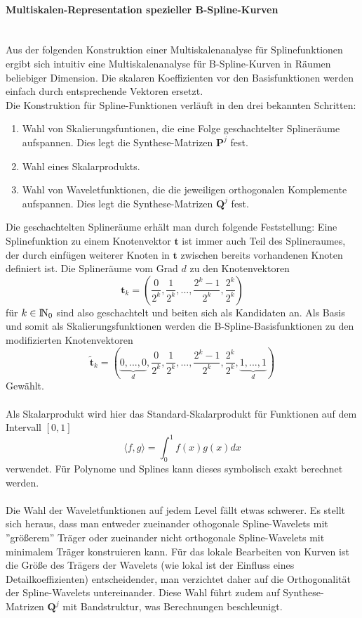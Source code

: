 \paragraph{Multiskalen-Representation spezieller B-Spline-Kurven}~\\
Aus der folgenden Konstruktion einer Multiskalenanalyse für Splinefunktionen ergibt sich intuitiv eine Multiskalenanalyse für B-Spline-Kurven in Räumen beliebiger Dimension. Die skalaren Koeffizienten vor den  Basisfunktionen werden einfach durch entsprechende Vektoren ersetzt. \\
Die Konstruktion für Spline-Funktionen verläuft in den drei bekannten Schritten: 
\begin{enumerate}
\item Wahl von Skalierungsfuntionen, die eine Folge geschachtelter Splineräume aufspannen. Dies legt die Synthese-Matrizen $\mathbf{P}^j$ fest. 
\item Wahl eines Skalarprodukts. 
\item Wahl von Waveletfunktionen, die die jeweiligen orthogonalen Komplemente aufspannen. Dies legt die Synthese-Matrizen $\mathbf{Q}^j$ fest.
\end{enumerate}
Die geschachtelten Splineräume erhält man durch folgende Feststellung: Eine Splinefunktion zu einem Knotenvektor $\mathbf{t}$ ist immer auch Teil des Splineraumes, der durch einfügen weiterer Knoten in $\mathbf{t}$ zwischen bereits vorhandenen Knoten definiert ist.
Die Splineräume vom Grad $d$ zu den Knotenvektoren
\[
\mathbf{t}_k=(\frac{0}{2^k},\frac{1}{2^k},...,\frac{2^k-1}{2^k},\frac{2^k}{2^k})
\]
für $k\in{\rm I\!N}_0$ sind also geschachtelt und beiten sich als Kandidaten an. Als Basis und somit als Skalierungsfunktionen werden die B-Spline-Basisfunktionen zu den modifizierten Knotenvektoren
\[
\mathbf{\tilde{t}}_k=(\underbrace{0,...,0}_{d},\frac{0}{2^k},\frac{1}{2^k},...,\frac{2^k-1}{2^k},\frac{2^k}{2^k},\underbrace{1,...,1}_{d})
\]
Gewählt.\\
\\
Als Skalarprodukt wird hier das Standard-Skalarprodukt für Funktionen auf dem Intervall $[0,1]$
\[
\langle f,g\rangle =\int_0^1f(x)g(x)dx
\]
verwendet. Für Polynome und Splines kann dieses symbolisch exakt berechnet werden.\\
\\
Die Wahl der Waveletfunktionen auf jedem Level fällt etwas schwerer. Es stellt sich heraus, dass man entweder zueinander othogonale Spline-Wavelets mit ''größerem'' Träger oder zueinander nicht orthogonale Spline-Wavelets mit minimalem Träger konstruieren kann. Für das lokale Bearbeiten von Kurven ist die Größe des Trägers der Wavelets (wie lokal ist der Einfluss eines Detailkoeffizienten) entscheidender, man verzichtet daher auf die Orthogonalität der Spline-Wavelets untereinander. Diese Wahl führt zudem auf Synthese-Matrizen $\mathbf{Q}^j$ mit Bandstruktur, was Berechnungen beschleunigt.
